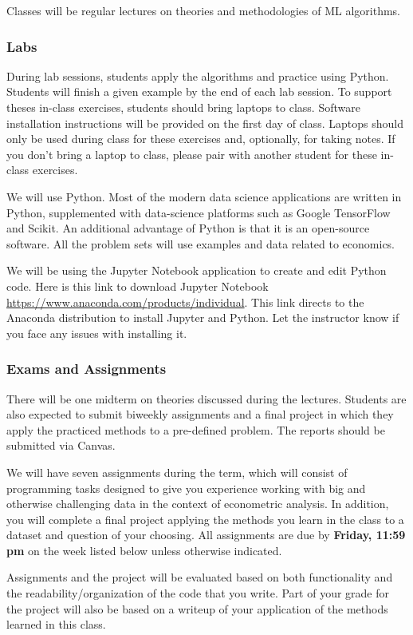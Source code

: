 \documentclass[11pt]{article}
\begin{document}
Classes will be regular lectures on theories and methodologies of ML algorithms. 

\subsubsection*{Labs }
During lab sessions, students apply the algorithms and practice using Python. Students will finish a given example by the end of each lab session.  To support theses in-class exercises, students should bring laptops to class.  Software installation instructions will be provided on the first day of class.  Laptops should only be used during class for these exercises and, optionally, for taking notes.  If you don't bring a laptop to class, please pair with another student for these in-class exercises.

We will use Python. Most of the modern data science applications are written in Python, supplemented with data-science platforms such as Google TensorFlow and Scikit. An additional advantage of Python is that it is an open-source software. All the problem sets will use examples and data related to economics.

We will be using the Jupyter Notebook application to create and edit Python code. Here is this link to download Jupyter Notebook \url{https://www.anaconda.com/products/individual}. This link directs to the Anaconda distribution to install Jupyter and Python. Let the instructor know if you face any issues with installing it.

\subsubsection*{Exams and Assignments}
There will be one midterm on theories discussed during the lectures. Students are also expected to submit biweekly assignments and a final project in which they apply the practiced methods to a pre-defined problem. The reports should be submitted via Canvas.

We will have seven assignments during the term, which will consist of programming tasks designed to give you experience working with big and otherwise challenging data in the context of econometric analysis. In addition, you will complete a final project applying the methods you learn in the class to a dataset and question of your choosing. All assignments are due by \textbf{Friday, 11:59 pm} on the week listed below unless otherwise indicated.

Assignments and the project will be evaluated based on both functionality and the readability/organization of the code that you write. Part of your grade for the project will also be based on a writeup of your application of the methods learned in this class.
\end{document}
